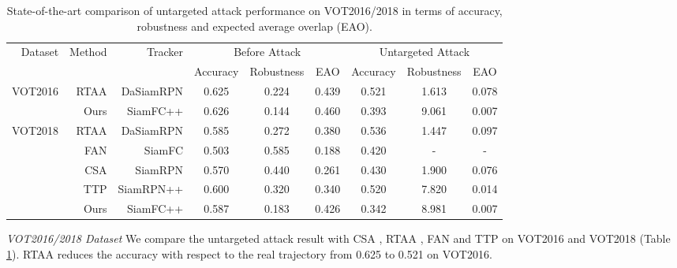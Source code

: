 \documentclass[journal]{IEEEtran}
\begin{document}
\begin{table}[t]
  \centering
  \caption{State-of-the-art comparison of untargeted attack performance on VOT2016/2018 in terms of accuracy, robustness and expected average overlap (EAO).}
  \begin{tabular}{rrrcccccc}
  \toprule
  \multirow{2}{*}[-2pt]{Dataset} & \multirow{2}{*}[-2pt]{Method} & \multirow{2}{*}[-2pt]{Tracker} & \multicolumn{3}{c}{Before Attack} & \multicolumn{3}{c}{Untargeted Attack} \\ \cmidrule{4-9}
                           &                         &                          & Accuracy   & Robustness  & EAO    & Accuracy    & Robustness    & EAO     \\ \midrule
  \multirow{2}{*}{VOT2016} & RTAA                    & DaSiamRPN                & 0.625      & 0.224       & 0.439  & 0.521       & 1.613         & 0.078   \\
                           & Ours                    & SiamFC++                 & 0.626      & 0.144       & 0.460  & 0.393       & 9.061         & 0.007   \\ \midrule
  \multirow{5}{*}{VOT2018} & RTAA                    & DaSiamRPN                & 0.585      & 0.272       & 0.380  & 0.536       & 1.447         & 0.097   \\
                           & FAN                     & SiamFC                   & 0.503      & 0.585       & 0.188  & 0.420       & -             & -       \\
                           & CSA                     & SiamRPN                  & 0.570      & 0.440       & 0.261  & 0.430       & 1.900         & 0.076   \\
                           & TTP                     & SiamRPN++                & 0.600      & 0.320       & 0.340  & 0.520       & 7.820         & 0.014   \\
                           & Ours                    & SiamFC++                 & 0.587      & 0.183       & 0.426  & 0.342       & 8.981         & 0.007   \\ \bottomrule
  \end{tabular}
  \label{tab:sota_vot}
\end{table}
\textit{VOT2016/2018 Dataset} We compare the untargeted attack result with CSA \cite{CSA}, RTAA \cite{RTAA}, FAN \cite{FAN} and TTP \cite{TTP} on VOT2016 and VOT2018 (Table \ref{tab:sota_vot}). 
RTAA reduces the accuracy with respect to the real trajectory from 0.625 to 0.521 on VOT2016.
\end{document}
